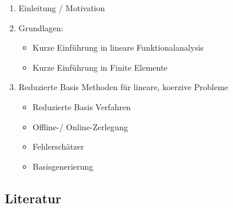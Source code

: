 \begin{enumerate}[1)]
	\item Einleitung / Motivation
	\item Grundlagen:
	\begin{itemize}
		\item Kurze Einführung in lineare Funktionalanalysis
		\item Kurze Einführung in Finite Elemente
	\end{itemize}
	\item Reduzierte Basis Methoden für lineare, koerzive Probleme
	\begin{itemize}
		\item Reduzierte Basis Verfahren
		\item Offline-/ Online-Zerlegung
		\item Fehlerschätzer
		\item Basisgenerierung
	\end{itemize}
\end{enumerate}


\subsection{Literatur}
\label{sub:lit}

